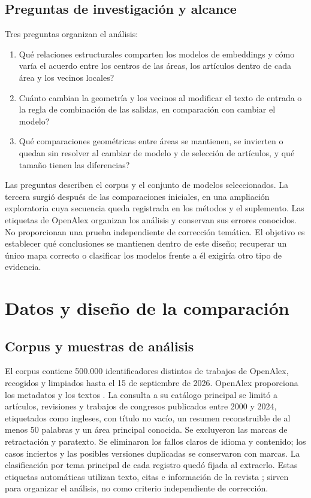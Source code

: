 \documentclass[12pt]{article}
\begin{document}
\subsection{Preguntas de investigación y alcance}
Tres preguntas organizan el análisis:

\begin{enumerate}
\item[\textbf{PI1.}] \textquestiondown{}Qué relaciones estructurales comparten los modelos de embeddings y cómo varía el acuerdo entre los centros de las áreas, los artículos dentro de cada área y los vecinos locales?
\item[\textbf{PI2.}] \textquestiondown{}Cuánto cambian la geometría y los vecinos al modificar el texto de entrada o la regla de combinación de las salidas, en comparación con cambiar el modelo?
\item[\textbf{PI3.}] \textquestiondown{}Qué comparaciones geométricas entre áreas se mantienen, se invierten o quedan sin resolver al cambiar de modelo y de selección de artículos, y qué tamaño tienen las diferencias?
\end{enumerate}

Las preguntas describen el corpus y el conjunto de modelos seleccionados. La tercera surgió después de las comparaciones iniciales, en una ampliación exploratoria cuya secuencia queda registrada en los métodos y el suplemento. Las etiquetas de OpenAlex organizan los análisis y conservan sus errores conocidos. No proporcionan una prueba independiente de corrección temática. El objetivo es establecer qué conclusiones se mantienen dentro de este diseño; recuperar un único mapa correcto o clasificar los modelos frente a él exigiría otro tipo de evidencia.

\section{Datos y diseño de la comparación}
\subsection{Corpus y muestras de análisis}
El corpus contiene 500.000 identificadores distintos de trabajos de OpenAlex, recogidos y limpiados hasta el 15 de septiembre de 2026. OpenAlex proporciona los metadatos y los textos \citep{priem2022openalex}. La consulta a su catálogo principal se limitó a artículos, revisiones y trabajos de congresos publicados entre 2000 y 2024, etiquetados como ingleses, con título no vacío, un resumen reconstruible de al menos 50 palabras y un área principal conocida. Se excluyeron las marcas de retractación y paratexto. Se eliminaron los fallos claros de idioma y contenido; los casos inciertos y las posibles versiones duplicadas se conservaron con marcas. La clasificación por tema principal de cada registro quedó fijada al extraerlo. Estas etiquetas automáticas utilizan texto, citas e información de la revista \citep{openalex2026topics}; sirven para organizar el análisis, no como criterio independiente de corrección.
\end{document}
